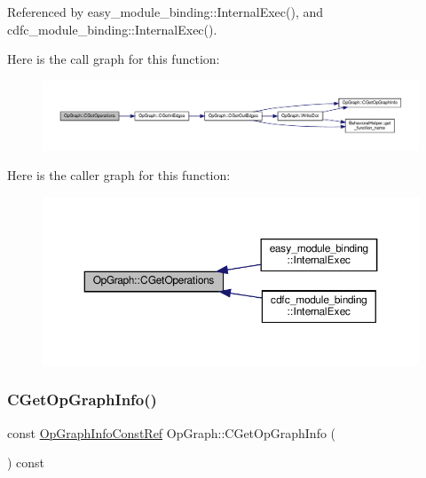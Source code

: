 Referenced by easy\+\_\+module\+\_\+binding\+::\+Internal\+Exec(), and cdfc\+\_\+module\+\_\+binding\+::\+Internal\+Exec().

Here is the call graph for this function\+:
\nopagebreak
\begin{figure}[H]
\begin{center}
\leavevmode
\includegraphics[width=350pt]{d6/d79/structOpGraph_a6a68fec329f88429b5b455dbcd2f2427_cgraph}
\end{center}
\end{figure}
Here is the caller graph for this function\+:
\nopagebreak
\begin{figure}[H]
\begin{center}
\leavevmode
\includegraphics[width=350pt]{d6/d79/structOpGraph_a6a68fec329f88429b5b455dbcd2f2427_icgraph}
\end{center}
\end{figure}
\mbox{\label{structOpGraph_a3f8d3d26ce28f7663105445996fc8fb8}} 
\subsubsection{\texorpdfstring{C\+Get\+Op\+Graph\+Info()}{CGetOpGraphInfo()}\hspace{0.1cm}{\footnotesize\ttfamily [1/2]}}
{\footnotesize\ttfamily const \hyperlink{op__graph_8hpp_af2fea39867a0ccd19a63845f5213dabc}{Op\+Graph\+Info\+Const\+Ref} Op\+Graph\+::\+C\+Get\+Op\+Graph\+Info (\begin{DoxyParamCaption}{ }\end{DoxyParamCaption}) const\hspace{0.3cm}{\ttfamily [inline]}}



